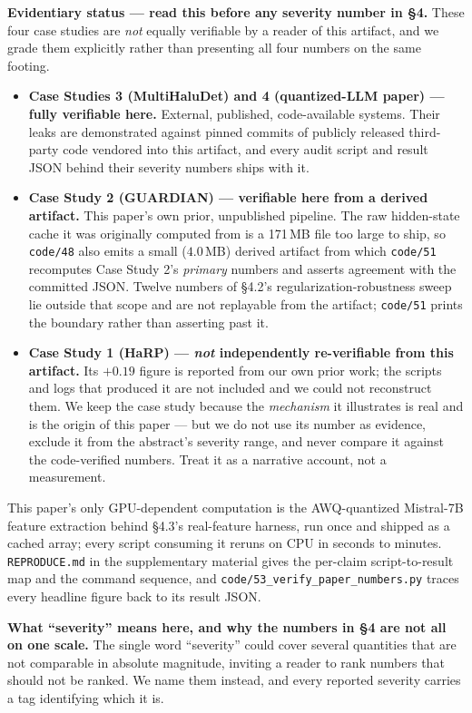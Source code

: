 \documentclass[10pt]{article} %
\begin{document}
\textbf{Evidentiary status --- read this before any severity number in §4.}
These four case studies are \emph{not} equally verifiable by a reader of this
artifact, and we grade them explicitly rather than presenting all four numbers
on the same footing.
\begin{itemize}
\itemsep0pt
\item \textbf{Case Studies 3 (MultiHaluDet) and 4 (quantized-LLM paper) ---
  fully verifiable here.} External, published, code-available systems. Their
  leaks are demonstrated against pinned commits of publicly released
  third-party code vendored into this artifact, and every audit script and
  result JSON behind their severity numbers ships with it.
\item \textbf{Case Study 2 (GUARDIAN) --- verifiable here from a derived
  artifact.} This paper's own prior, unpublished pipeline. The raw hidden-state
  cache it was originally computed from is a 171\,MB file too large to ship, so
  \texttt{code/48} also emits a small ($4.0$\,MB) derived artifact from which
  \texttt{code/51} recomputes Case Study 2's \emph{primary} numbers and asserts
  agreement with the committed JSON. Twelve numbers of §4.2's
  regularization-robustness sweep lie outside that scope and are not replayable
  from the artifact; \texttt{code/51} prints the boundary rather than asserting
  past it.
\item \textbf{Case Study 1 (HaRP) --- \emph{not} independently re-verifiable
  from this artifact.} Its $+0.19$ figure is reported from our own prior work;
  the scripts and logs that produced it are not included and we could not
  reconstruct them. We keep the case study because the \emph{mechanism} it
  illustrates is real and is the origin of this paper --- but we do not use its
  number as evidence, exclude it from the abstract's severity range, and never
  compare it against the code-verified numbers. Treat it as a narrative
  account, not a measurement.
\end{itemize}

\noindent This paper's only GPU-dependent computation is the AWQ-quantized
Mistral-7B feature extraction behind §4.3's real-feature harness, run once and
shipped as a cached array; every script consuming it reruns on CPU in seconds
to minutes. \texttt{REPRODUCE.md} in the supplementary material gives the
per-claim script-to-result map and the command sequence, and
\texttt{code/53\_verify\_paper\_numbers.py} traces every headline figure back
to its result JSON.

\textbf{What ``severity'' means here, and why the numbers in §4 are not all on
one scale.} The single word ``severity'' could cover several quantities that
are not comparable in absolute magnitude, inviting a reader to rank numbers
that should not be ranked. We name them instead, and every reported severity
carries a tag identifying which it is.
\end{document}
